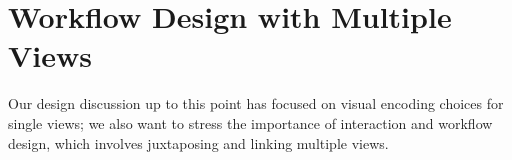 
\section{Workflow Design with Multiple Views}
\label{emu:design:workflows}


Our design discussion up to this point has focused on visual encoding choices for single views; we also want to stress the importance of interaction and workflow design, which involves juxtaposing and linking multiple views.

